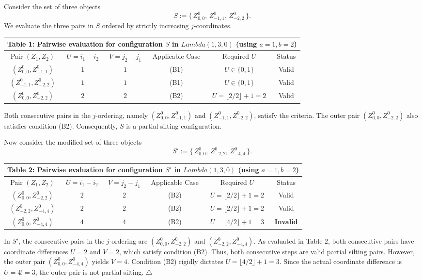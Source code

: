 \documentclass[11pt, a4paper]{article}
\theoremstyle{definition}
\def\Lambda{Lambda}%
\def\neq{!=}%
\begin{document}
Consider the set of three objects
\[
  S := \bigl\{\, Z_{0,0}^0,\, Z_{-1,1}^0,\, Z_{-2,2}^0 \,\bigr\}.
\]
We evaluate the three pairs in $S$ ordered by strictly increasing $j$-coordinates.

\begin{table}[htbp]
\centering
\small
\begin{tabular}{c|c|c|c|c|c}
\multicolumn{6}{c}{Table 1: Pairwise evaluation for configuration $S$ in $\Lambda(1,3,0)$ (using $a=1, b=2$)} \\
\hline
Pair $(Z_1, Z_2)$ & $U = i_1 - i_2$ & $V = j_2 - j_1$ & Applicable Case & Required $U$ & Status \\
\hline
$(Z_{0,0}^0, Z_{-1,1}^0)$ & $1$ & $1$ & (B1) & $U \in \{0,1\}$ & Valid \\
$(Z_{-1,1}^0, Z_{-2,2}^0)$ & $1$ & $1$ & (B1) & $U \in \{0,1\}$ & Valid \\
$(Z_{0,0}^0, Z_{-2,2}^0)$ & $2$ & $2$ & (B2) & $U = \lfloor 2/2 \rfloor + 1 = 2$ & Valid
\end{tabular}
\end{table}

Both consecutive pairs in the $j$-ordering, namely $(Z_{0,0}^0, Z_{-1,1}^0)$ and $(Z_{-1,1}^0, Z_{-2,2}^0)$, satisfy the criteria. The outer pair $(Z_{0,0}^0, Z_{-2,2}^0)$ also satisfies condition (B2). Consequently, $S$ is a partial silting configuration.

Now consider the modified set of three objects
\[
  S' := \bigl\{\, Z_{0,0}^0,\, Z_{-2,2}^0,\, Z_{-4,4}^0 \,\bigr\}.
\]

\begin{table}[htbp]
\centering
\small
\begin{tabular}{c|c|c|c|c|c}
\multicolumn{6}{c}{Table 2: Pairwise evaluation for configuration $S'$ in $\Lambda(1,3,0)$ (using $a=1, b=2$)} \\
\hline
Pair $(Z_1, Z_2)$ & $U = i_1 - i_2$ & $V = j_2 - j_1$ & Applicable Case & Required $U$ & Status \\
\hline
$(Z_{0,0}^0, Z_{-2,2}^0)$ & $2$ & $2$ & (B2) & $U = \lfloor 2/2 \rfloor + 1 = 2$ & Valid \\
$(Z_{-2,2}^0, Z_{-4,4}^0)$ & $2$ & $2$ & (B2) & $U = \lfloor 2/2 \rfloor + 1 = 2$ & Valid \\
$(Z_{0,0}^0, Z_{-4,4}^0)$ & $4$ & $4$ & (B2) & $U = \lfloor 4/2 \rfloor + 1 = 3$ & \textbf{Invalid}
\end{tabular}
\end{table}

In $S'$, the consecutive pairs in the $j$-ordering are $(Z_{0,0}^0, Z_{-2,2}^0)$ and $(Z_{-2,2}^0, Z_{-4,4}^0)$. As evaluated in Table 2, both consecutive pairs have coordinate differences $U=2$ and $V=2$, which satisfy condition (B2). Thus, both consecutive steps are valid partial silting pairs. However, the outer pair $(Z_{0,0}^0, Z_{-4,4}^0)$ yields $V=4$. Condition (B2) rigidly dictates $U = \lfloor 4/2 \rfloor + 1 = 3$. Since the actual coordinate difference is $U = 4 \neq 3$, the outer pair is not partial silting. \hfill $\triangle$
\end{document}
